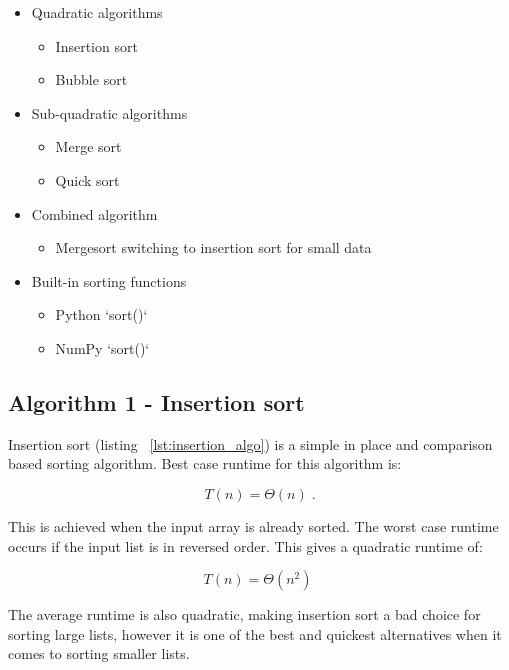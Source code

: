 \documentclass[sigconf, nonacm, natbib, screen, balance=False]{acmart}
\begin{document}
\begin{itemize}

\item Quadratic algorithms
  \begin{itemize}
  \item Insertion sort
  \item Bubble sort
  \end{itemize}
\item Sub-quadratic algorithms
  \begin{itemize}
  \item Merge sort
  \item Quick sort
  \end{itemize}
\item Combined algorithm
  \begin{itemize}
  \item Mergesort switching to insertion sort for small data
  \end{itemize}
\item Built-in sorting functions
  \begin{itemize}
  \item Python `sort()`
  \item NumPy `sort()`
  \end{itemize}
\end{itemize}

\subsection{Algorithm 1 - Insertion sort}\label{sec:algo1}
Insertion sort (listing ~\ref{lst:insertion_algo}) is a simple in place and comparison based sorting algorithm. Best case runtime for this algorithm is:

\begin{equation}
  T(n) = \Theta(n) \;.  \label{eq:ins_sort_best}
\end{equation}

This is achieved when the input array is already sorted. The worst case runtime occurs if the input list is in reversed order. This gives a quadratic runtime of:

\begin{equation}
  T(n) = \Theta(n^2) \;  \label{eq:ins_sort_best}
\end{equation}

The average runtime is also quadratic, making insertion sort a bad choice for sorting large lists, however it is one of the best and quickest alternatives when it comes to sorting smaller lists. 
\end{document}
